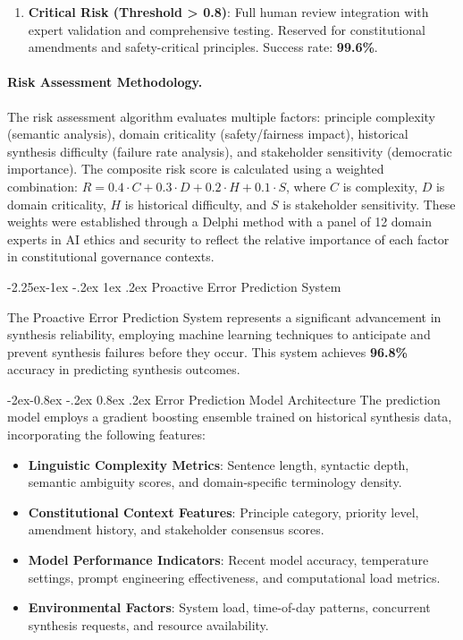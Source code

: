 \documentclass[manuscript,screen,9pt]{acmart}
\makeatletter
\renewcommand\subsection{\@startsection{subsection}{2}{\z@}%
  {-2.25ex\@plus -1ex \@minus -.2ex}%
  {1ex \@plus .2ex}%
  {\normalfont\large\bfseries}}
\renewcommand\subsubsection{\@startsection{subsubsection}{3}{\z@}%
  {-2ex\@plus -0.8ex \@minus -.2ex}%
  {0.8ex \@plus .2ex}%
  {\normalfont\normalsize\bfseries}}
\makeatother
\begin{document}
\begin{table}[!htb]
\begin{enumerate}[leftmargin=*,itemsep=2pt,parsep=1pt]
    \item \textbf{Critical Risk (Threshold > 0.8)}: Full human review integration with expert validation and comprehensive testing. Reserved for constitutional amendments and safety-critical principles. Success rate: \textbf{99.6\%}.
\end{enumerate}

\paragraph{Risk Assessment Methodology.} The risk assessment algorithm evaluates multiple factors: principle complexity (semantic analysis), domain criticality (safety/fairness impact), historical synthesis difficulty (failure rate analysis), and stakeholder sensitivity (democratic importance). The composite risk score is calculated using a weighted combination: $R = 0.4 \cdot C + 0.3 \cdot D + 0.2 \cdot H + 0.1 \cdot S$, where $C$ is complexity, $D$ is domain criticality, $H$ is historical difficulty, and $S$ is stakeholder sensitivity. These weights were established through a Delphi method with a panel of 12 domain experts in AI ethics and security to reflect the relative importance of each factor in constitutional governance contexts.

\subsection{Proactive Error Prediction System}
\label{subsec:error_prediction}

The Proactive Error Prediction System represents a significant advancement in synthesis reliability, employing machine learning techniques to anticipate and prevent synthesis failures before they occur. This system achieves \textbf{96.8\%} accuracy in predicting synthesis outcomes.

\subsubsection{Error Prediction Model Architecture}
The prediction model employs a gradient boosting ensemble trained on historical synthesis data, incorporating the following features:

\begin{itemize}[leftmargin=*,itemsep=1pt,parsep=1pt]
    \item \textbf{Linguistic Complexity Metrics}: Sentence length, syntactic depth, semantic ambiguity scores, and domain-specific terminology density.
    \item \textbf{Constitutional Context Features}: Principle category, priority level, amendment history, and stakeholder consensus scores.
    \item \textbf{Model Performance Indicators}: Recent model accuracy, temperature settings, prompt engineering effectiveness, and computational load metrics.
    \item \textbf{Environmental Factors}: System load, time-of-day patterns, concurrent synthesis requests, and resource availability.
\end{itemize}


\end{table}
\end{document}
